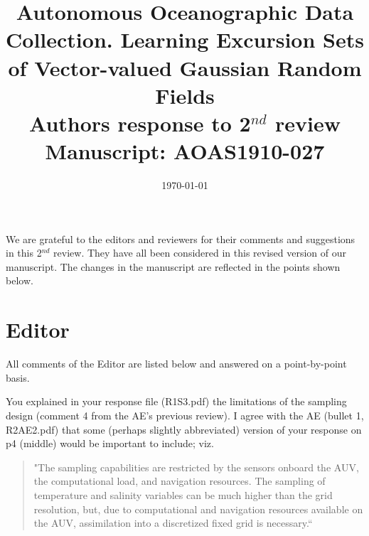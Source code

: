 \documentclass[a4paper]{article}
\newcounter{reviewer}
\begin{document}
\title{Autonomous Oceanographic Data Collection. Learning Excursion Sets of Vector-valued Gaussian Random Fields
  \\\vspace{5mm}
 Authors response to 2$^{nd}$ review
  \\\vspace{5mm}
\small{Manuscript: AOAS1910-027}}
\author{ }

\date{\today}

\maketitle

We are grateful to the editors and reviewers for their comments and suggestions in this 2$^{nd}$ review. They have all been considered in this revised version of our manuscript. The changes in the manuscript are reflected in the points shown below.\\

\par \vspace{1em}


\section*{Editor}
All comments of the Editor are listed below and answered on a point-by-point basis.

\vspace{5mm}
 You explained in your response file (R1S3.pdf) the limitations of the sampling design (comment 4 from the AE's previous review). I agree with the AE (bullet 1, R2AE2.pdf) that some (perhaps slightly abbreviated) version of your response on p4 (middle) would be important to include; viz.

\begin{quote}
"The sampling capabilities are restricted by the sensors onboard the AUV, the computational load, and navigation resources. The sampling of temperature and salinity variables can be much higher than the grid resolution, but, due to computational and navigation resources available on the AUV, assimilation into a discretized fixed grid is necessary.`` 
\end{quote}
\end{document}
